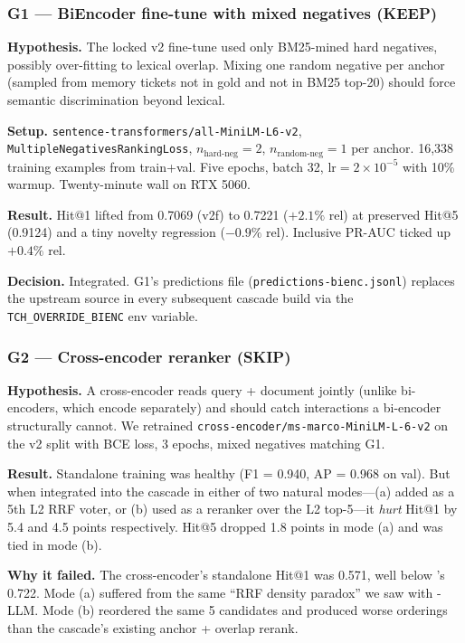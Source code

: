 \subsubsection{G1 --- BiEncoder fine-tune with mixed negatives (KEEP)}

\textbf{Hypothesis.} The locked v2 \bienc{} fine-tune used only BM25-mined hard negatives, possibly over-fitting to lexical overlap. Mixing one random negative per anchor (sampled from memory tickets not in gold and not in BM25 top-20) should force semantic discrimination beyond lexical.

\textbf{Setup.} \texttt{sentence-transformers/all-MiniLM-L6-v2}, \texttt{MultipleNegativesRankingLoss}, $n_{\text{hard-neg}} = 2$, $n_{\text{random-neg}} = 1$ per anchor. 16{,}338 training examples from train+val. Five epochs, batch 32, $\mathrm{lr} = 2 \times 10^{-5}$ with 10\% warmup. Twenty-minute wall on RTX 5060.

\textbf{Result.} Hit@1 lifted from 0.7069 (v2f) to 0.7221 ($+2.1\%$ rel) at preserved Hit@5 (0.9124) and a tiny novelty regression ($-0.9\%$ rel). Inclusive PR-AUC ticked up $+0.4\%$ rel.

\textbf{Decision.} Integrated. G1's predictions file (\texttt{predictions-bienc.jsonl}) replaces the upstream \bienc{} source in every subsequent cascade build via the \texttt{TCH\_OVERRIDE\_BIENC} env variable.

\subsubsection{G2 --- Cross-encoder reranker (SKIP)}

\textbf{Hypothesis.} A cross-encoder reads query + document jointly (unlike bi-encoders, which encode separately) and should catch interactions a bi-encoder structurally cannot. We retrained \texttt{cross-encoder/ms-marco-MiniLM-L-6-v2} on the v2 split with BCE loss, 3 epochs, mixed negatives matching G1.

\textbf{Result.} Standalone training was healthy (F1 = 0.940, AP = 0.968 on val). But when integrated into the cascade in either of two natural modes---(a) added as a 5th L2 RRF voter, or (b) used as a reranker over the L2 top-5---it \emph{hurt} Hit@1 by 5.4 and 4.5 points respectively. Hit@5 dropped 1.8 points in mode (a) and was tied in mode (b).

\textbf{Why it failed.} The cross-encoder's standalone Hit@1 was 0.571, well below \bienc{}'s 0.722. Mode (a) suffered from the same ``RRF density paradox'' we saw with \hrrf{}-LLM. Mode (b) reordered the same 5 candidates and produced worse orderings than the cascade's existing anchor + overlap rerank.

